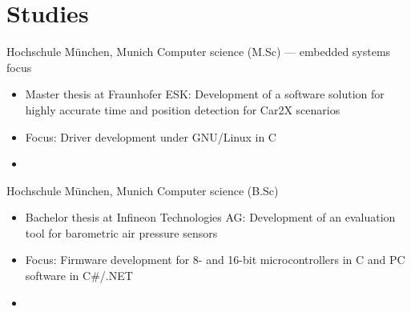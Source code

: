 \documentclass[%
               doublesided,
               paper=a4,
               fontsize=10pt
              ]{my-resume}
\begin{document}
{    \section[\faMortarBoard]{Studies}
        {Hochschule München, Munich}
        {Computer science (M.Sc) --- embedded systems focus}
        {\begin{itemize}
            \item Master thesis at Fraunhofer ESK: Development of a software solution for highly accurate time and position detection for Car2X scenarios
            \item Focus: Driver development under GNU/Linux in C
            \item[]  
        \end{itemize}}
    
        {Hochschule München, Munich}
        {Computer science (B.Sc)}
        {\begin{itemize}
            \item Bachelor thesis at Infineon Technologies AG: Development of an evaluation tool for barometric air pressure sensors
            \item Focus: Firmware development for 8- and 16-bit microcontrollers in C and PC software in C\#/.NET
            \item[]   
        \end{itemize}}
    
    
}
\makebody
\clearpage
\end{document}
